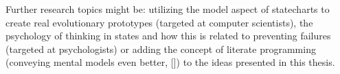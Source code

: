Further research topics might be: utilizing the model aspect of statecharts to create real evolutionary prototypes (targeted at computer scientists), the psychology of thinking in states and how this is related to preventing failures (targeted at psychologists) or adding the concept of literate programming (conveying mental models even better, [\textcite{knuth_literate_1984}]) to the ideas presented in this thesis.






